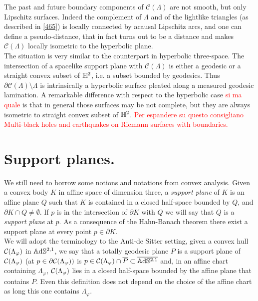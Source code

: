 \begin{observation}\label{467}
The past and future boundary components of $\mathcal{C}(\Lambda)$ are not smooth, but only Lipschitz surfaces. Indeed the complement of $\Lambda$ and of the lightlike triangles (as described in \ref{465}) is locally connected by acausal Lipschitz arcs, and one can define a pseudo-distance, that in fact turns out to be a distance and makes $\mathcal{C}(\Lambda)$ locally isometric to the hyperbolic plane. \\
The situation is very similar to the counterpart in hyperbolic three-space. The intersection of a spacelike support plane with $\mathcal{C}(\Lambda)$ is either a geodesic or a straight convex subset of $\mathbb{H}^2$, i.e. a subset bounded by geodesics. Thus $\partial\mathcal{C}(\Lambda)\setminus\Lambda$ is intrinsically a hyperbolic surface pleated along a measured geodesic lamination. A remarkable difference with respect to the hyperbolic case \textcolor{red}{si ma quale} is that in general those surfaces may be not complete, but they are always isometric to straight convex subset of $\mathbb{H}^2$. \textcolor{red}{Per espandere su questo consigliano Multi-black holes and earthquakes on Riemann surfaces with boundaries.}

\end{observation}

\section{Support planes.}\label{sectionplanes}
We still need to borrow some notions and notations from convex analysis. Given a convex body $K$ in affine space of dimension three, a \textit{support plane} of $K$ is an affine plane $Q$ such that $K$ is contained in a closed half-space bounded by $Q$, and $\partial K\cap Q\neq\emptyset.$ If $p$ is in the intersection of $\partial K$ with $Q$ we will say that $Q$ is a \textit{support plane} at $p$. As a consequence of the Hahn-Banach theorem there exist a support plane at every point $p\in\partial K.$ \\
We will adopt the terminology to the Anti-de Sitter setting, given a convex hull $\mathcal{C}(\Lambda_\varphi)$ in $\mathbb{A}\mathrm{d}\mathbb{S}^{2,1}$, we say that a totally geodesic plane $P$ is a support plane of $\mathcal{C}(\Lambda_\varphi)$ (at $p\in\partial\mathcal{C}(\Lambda_\varphi))$ is $p\in\mathcal{C}(\Lambda_\varphi)\cap \overline{P}\subset\overline{\mathbb{A}\mathrm{d}\mathbb{S}^{2,1}}$ and, in an affine chart containing $\Lambda_\varphi$, $\mathcal{C}(\Lambda_\varphi)$ lies in a closed half-space bounded by the affine plane that contains $P$. Even this definition does not depend on the choice of the affine chart as long this one contains $\Lambda_\varphi$.\\ 

